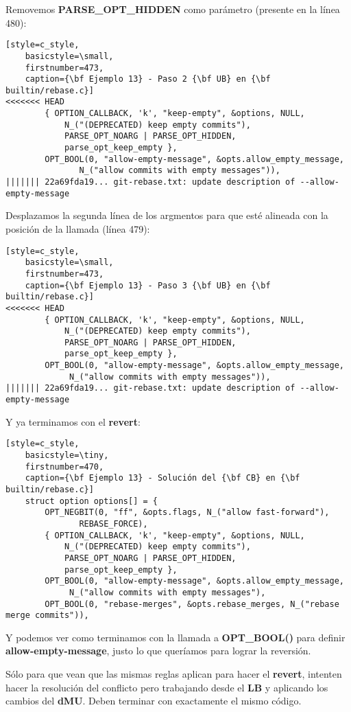 Removemos {\bf PARSE\_OPT\_HIDDEN} como parámetro (presente en la línea 480):
\begin{lstlisting}[style=c_style,
	basicstyle=\small,
	firstnumber=473,
	caption={\bf Ejemplo 13} - Paso 2 {\bf UB} en {\bf builtin/rebase.c}]
<<<<<<< HEAD
		{ OPTION_CALLBACK, 'k', "keep-empty", &options, NULL,
			N_("(DEPRECATED) keep empty commits"),
			PARSE_OPT_NOARG | PARSE_OPT_HIDDEN,
			parse_opt_keep_empty },
		OPT_BOOL(0, "allow-empty-message", &opts.allow_empty_message,
			   N_("allow commits with empty messages")),
||||||| 22a69fda19... git-rebase.txt: update description of --allow-empty-message
\end{lstlisting}

Desplazamos la segunda línea de los argmentos para que esté alineada con la posición de la
llamada (línea 479):
\begin{lstlisting}[style=c_style,
	basicstyle=\small,
	firstnumber=473,
	caption={\bf Ejemplo 13} - Paso 3 {\bf UB} en {\bf builtin/rebase.c}]
<<<<<<< HEAD
		{ OPTION_CALLBACK, 'k', "keep-empty", &options, NULL,
			N_("(DEPRECATED) keep empty commits"),
			PARSE_OPT_NOARG | PARSE_OPT_HIDDEN,
			parse_opt_keep_empty },
		OPT_BOOL(0, "allow-empty-message", &opts.allow_empty_message,
			 N_("allow commits with empty messages")),
||||||| 22a69fda19... git-rebase.txt: update description of --allow-empty-message
\end{lstlisting}

Y ya terminamos con el {\bf revert}:

\begin{lstlisting}[style=c_style,
	basicstyle=\tiny,
	firstnumber=470,
	caption={\bf Ejemplo 13} - Solución del {\bf CB} en {\bf builtin/rebase.c}]
	struct option options[] = {
		OPT_NEGBIT(0, "ff", &opts.flags, N_("allow fast-forward"),
			   REBASE_FORCE),
		{ OPTION_CALLBACK, 'k', "keep-empty", &options, NULL,
			N_("(DEPRECATED) keep empty commits"),
			PARSE_OPT_NOARG | PARSE_OPT_HIDDEN,
			parse_opt_keep_empty },
		OPT_BOOL(0, "allow-empty-message", &opts.allow_empty_message,
			 N_("allow commits with empty messages"),
		OPT_BOOL(0, "rebase-merges", &opts.rebase_merges, N_("rebase merge commits")),
\end{lstlisting}

Y podemos ver como terminamos con la llamada a {\bf OPT\_BOOL()} para definir {\bf allow-empty-message}, justo lo que
queríamos para lograr la reversión.

Sólo para que vean que las mismas reglas aplican para hacer el {\bf revert}, intenten hacer la resolución del conflicto pero
trabajando desde el {\bf LB} y aplicando los cambios del {\bf dMU}. Deben terminar con exactamente el mismo código.

